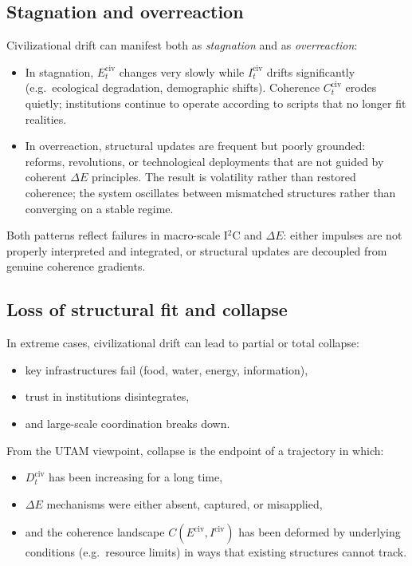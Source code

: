 \documentclass[12pt,a4paper]{report}
\begin{document}
\subsection*{Stagnation and overreaction}

Civilizational drift can manifest both as \emph{stagnation} and as \emph{overreaction}:

\begin{itemize}[leftmargin=2em]
    \item In stagnation, \(E_t^{\mathrm{civ}}\) changes very slowly while \(I_t^{\mathrm{civ}}\) drifts significantly (e.g.\ ecological degradation, demographic shifts). Coherence \(C_t^{\mathrm{civ}}\) erodes quietly; institutions continue to operate according to scripts that no longer fit realities.
    \item In overreaction, structural updates are frequent but poorly grounded: reforms, revolutions, or technological deployments that are not guided by coherent $\Delta E$ principles. The result is volatility rather than restored coherence; the system oscillates between mismatched structures rather than converging on a stable regime.
\end{itemize}

Both patterns reflect failures in macro-scale I$^2$C and $\Delta E$: either impulses are not properly interpreted and integrated, or structural updates are decoupled from genuine coherence gradients.

\subsection*{Loss of structural fit and collapse}

In extreme cases, civilizational drift can lead to partial or total collapse:

\begin{itemize}[leftmargin=2em]
    \item key infrastructures fail (food, water, energy, information),
    \item trust in institutions disintegrates,
    \item and large-scale coordination breaks down.
\end{itemize}

From the UTAM viewpoint, collapse is the endpoint of a trajectory in which:

\begin{itemize}[leftmargin=2em]
    \item \(D_t^{\mathrm{civ}}\) has been increasing for a long time,
    \item \(\Delta E\) mechanisms were either absent, captured, or misapplied,
    \item and the coherence landscape \(C(E^{\mathrm{civ}}, I^{\mathrm{civ}})\) has been deformed by underlying conditions (e.g.\ resource limits) in ways that existing structures cannot track.
\end{itemize}
\end{document}
